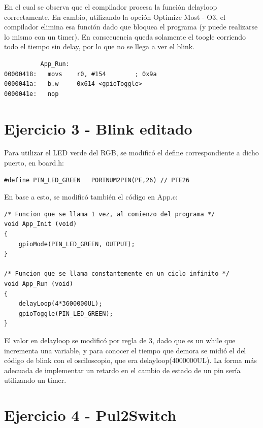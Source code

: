 \documentclass{article}
\begin{document}
En el cual se observa que el compilador procesa la función delayloop correctamente. En cambio, utilizando la opción Optimize Most - O3, el compilador elimina esa función dado que bloquea el programa (y puede realizarse lo mismo con un timer). En consecuencia queda solamente el toogle corriendo todo el tiempo sin delay, por lo que no se llega a ver el blink.

\begin{lstlisting}
          App_Run:
00000418:   movs    r0, #154        ; 0x9a
0000041a:   b.w     0x614 <gpioToggle>
0000041e:   nop     
\end{lstlisting}

\newpage

\section*{Ejercicio 3 - Blink editado}

Para utilizar el LED verde del RGB, se modificó el define correspondiente a dicho puerto, en board.h:

\begin{lstlisting}
#define PIN_LED_GREEN   PORTNUM2PIN(PE,26) // PTE26
\end{lstlisting}

En base a esto, se modificó también el código en App.c:

\begin{lstlisting}
/* Funcion que se llama 1 vez, al comienzo del programa */
void App_Init (void)
{
    gpioMode(PIN_LED_GREEN, OUTPUT);
}

/* Funcion que se llama constantemente en un ciclo infinito */
void App_Run (void)
{
    delayLoop(4*3600000UL);
    gpioToggle(PIN_LED_GREEN);
}
\end{lstlisting}

El valor en delayloop se modificó por regla de 3, dado que es un while que incrementa una variable, y para conocer el tiempo que demora se midió el del código de blink con el osciloscopio, que era delayloop(4000000UL). La forma más adecuada de implementar un retardo en el cambio de estado de un pin sería utilizando un timer.

\newpage

\section*{Ejercicio 4 - Pul2Switch}
\end{document}
